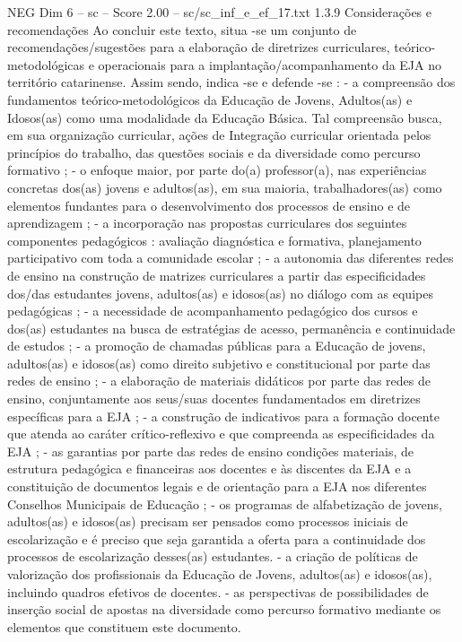 \begin{textsample}{NEG Dim 6 – sc – Score 2.00 – sc/sc\_inf\_e\_ef\_17.txt}  \label{ex:f6_neg_276}
1.3.9 Considerações e recomendações Ao concluir este texto, situa -se um conjunto de recomendações/sugestões para a elaboração de diretrizes curriculares, teórico-metodológicas e operacionais para a implantação/acompanhamento da EJA no território catarinense.
Assim sendo, indica -se e defende -se : - a compreensão dos fundamentos teórico-metodológicos da Educação de Jovens, Adultos(as) e Idosos(as) como uma modalidade da Educação Básica.
Tal compreensão busca, em sua organização curricular, ações de Integração curricular orientada pelos princípios do trabalho, das questões sociais e da diversidade como percurso formativo ; - o enfoque maior, por parte do(a) professor(a), nas experiências concretas dos(as) jovens e adultos(as), em sua maioria, trabalhadores(as) como elementos fundantes para o desenvolvimento dos processos de ensino e de aprendizagem ; - a incorporação nas propostas curriculares dos seguintes componentes pedagógicos : avaliação diagnóstica e formativa, planejamento participativo com toda a comunidade escolar ; - a autonomia das diferentes redes de ensino na construção de matrizes curriculares a partir das especificidades dos/das estudantes jovens, adultos(as) e idosos(as) no diálogo com as equipes pedagógicas ; - a necessidade de acompanhamento pedagógico dos cursos e dos(as) estudantes na busca de estratégias de acesso, permanência e continuidade de estudos ; - a promoção de chamadas públicas para a Educação de jovens, adultos(as) e idosos(as) como direito subjetivo e constitucional por parte das redes de ensino ; - a elaboração de materiais didáticos por parte das redes de ensino, conjuntamente aos seus/suas docentes fundamentados em diretrizes específicas para a EJA ; - a construção de indicativos para a formação docente que atenda ao caráter crítico-reflexivo e que compreenda as especificidades da EJA ; - as garantias por parte das redes de ensino condições materiais, de estrutura pedagógica e financeiras aos docentes e às discentes da EJA e a constituição de documentos legais e de orientação para a EJA nos diferentes Conselhos Municipais de Educação ; - os programas de alfabetização de jovens, adultos(as) e idosos(as) precisam ser pensados como processos iniciais de escolarização e é preciso que seja garantida a oferta para a continuidade dos processos de escolarização desses(as) estudantes. - a criação de políticas de valorização dos profissionais da Educação de Jovens, adultos(as) e idosos(as), incluindo quadros efetivos de docentes. - as perspectivas de possibilidades de inserção social de apostas na diversidade como percurso formativo mediante os elementos que constituem este documento.

\end{textsample}
